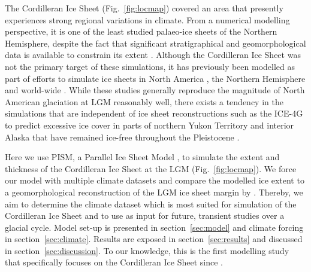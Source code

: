 The Cordilleran Ice Sheet (Fig.~\ref{fig:locmap}) covered an area that presently experiences strong regional variations in climate. From a numerical modelling perspective, it is one of the least studied palaeo-ice sheets of the Northern Hemisphere, despite the fact that significant stratigraphical and geomorphological data is available to constrain its extent \citep{jackson-clague-1991,dukrodkin-1999,kaufman-manley-2004,kleman-etal-2010,margold-etal-2011}. Although the Cordilleran Ice Sheet was not the primary target of these simulations, it has previously been modelled as part of efforts to simulate ice sheets in North America \citep{marshall-clarke-1999,calov-etal-2002,tarasov-peltier-1997,tarasov-peltier-2004,gregoire-etal-2012}, the Northern Hemisphere \citep{huybrechts-tsiobbel-1996,greve-etal-1999,charbit-etal-2002,charbit-etal-2007,charbit-etal-2013,johnson-fastook-2002,rodgers-etal-2004,bintanja-etal-2005,zweck-huybrechts-2005,abeouchi-etal-2007} and world-wide \citep{yoshimori-etal-2001}. While these studies generally reproduce the magnitude of North American glaciation at LGM reasonably well, there exists a tendency in the simulations that are independent of ice sheet reconstructions such as the ICE-4G to predict excessive ice cover in parts of northern Yukon Territory and interior Alaska that have remained ice-free throughout the Pleistocene \citep{dukrodkin-1999,kaufman-manley-2004}.

Here we use PISM, a Parallel Ice Sheet Model \citep{web:pism}, to simulate the extent and thickness of the Cordilleran Ice Sheet at the LGM (Fig.~\ref{fig:locmap}). We force our model with multiple climate datasets and compare the modelled ice extent to a geomorphological reconstruction of the LGM ice sheet margin by \citet{dyke-2004}. Thereby, we aim to determine the climate dataset which is most suited for simulation of the Cordilleran Ice Sheet and to use as input for future, transient studies over a glacial cycle. Model set-up is presented in section~\ref{sec:model} and climate forcing in section~\ref{sec:climate}. Results are exposed in section~\ref{sec:results} and discussed in section~\ref{sec:discussion}. To our knowledge, this is the first modelling study that specifically focuses on the Cordilleran Ice Sheet since \citet{robert-1991}.

